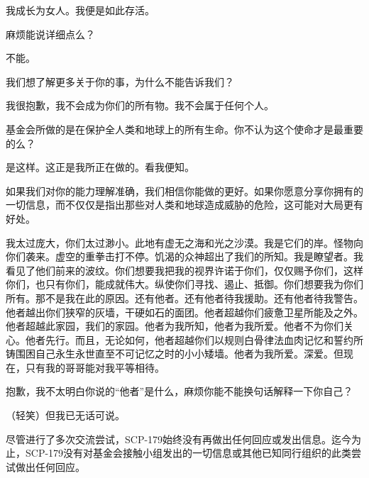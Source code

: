 \begin{scpbox}
我成长为女人。我便是如此存活。

麻烦能说详细点么？

不能。

我们想了解更多关于你的事，为什么不能告诉我们？

我很抱歉，我不会成为你们的所有物。我不会属于任何个人。

基金会所做的是在保护全人类和地球上的所有生命。你不认为这个使命才是最重要的么？

是这样。这正是我所正在做的。看我便知。

如果我们对你的能力理解准确，我们相信你能做的更好。如果你愿意分享你拥有的一切信息，而不仅仅是指出那些对人类和地球造成威胁的危险，这可能对大局更有好处。

我太过庞大，你们太过渺小。此地有虚无之海和光之沙漠。我是它们的岸。怪物向你们袭来。虚空的重拳击打不停。饥渴的众神超出了我们的所知。我是瞭望者。我看见了他们前来的波纹。你们想要我把我的视界许诺于你们，仅仅赐予你们，这样你们，也只有你们，能成就伟大。纵使你们寻找、遏止、抵御。你们想要我为你们所有。那不是我在此的原因。还有他者。还有他者待我援助。还有他者待我警告。他者越出你们狭窄的灰墙，干硬如石的面团。他者超越你们疲惫卫星所能及之外。他者超越此家园，我们的家园。他者为我所知，他者为我所爱。他者不为你们关心。他者先行。而且，无论如何，他者超越你们以规则白骨律法血肉记忆和誓约所铸围困自己永生永世直至不可记忆之时的小小矮墙。他者为我所爱。深爱。但现在，只有我的哥哥能对我平等相待。

抱歉，我不太明白你说的“他者”是什么，麻烦你能不能换句话解释一下你自己？

（轻笑）但我已无话可说。

\end{scpbox}

尽管进行了多次交流尝试，SCP-179始终没有再做出任何回应或发出信息。迄今为止，SCP-179没有对基金会接触小组发出的一切信息或其他已知同行组织的此类尝试做出任何回应。
